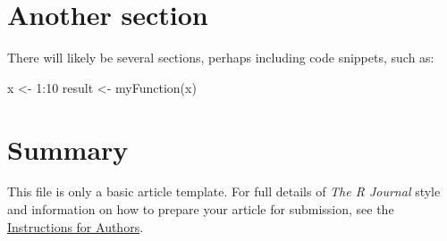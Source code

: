 \section{Another section}

There will likely be several sections, perhaps including code snippets, such as:

\begin{example}
  x <- 1:10
  result <- myFunction(x)
\end{example}

\section{Summary}

This file is only a basic article template. For full details of \emph{The R Journal} style and information on how to prepare your article for submission, see the \href{http://journal.r-project.org/share/author-guide.pdf}{Instructions for Authors}.



\address{Author One\\
  Affiliation\\
  Address\\
  Country\\}

\address{Author Two\\
  Affiliation\\
  Address\\
  Country\\}

\address{Author Three\\
  Affiliation\\
  Address\\
  Country\\}
